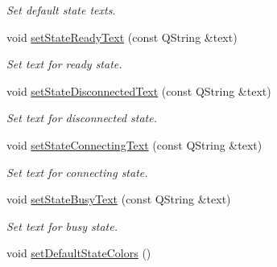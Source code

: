 \begin{DoxyCompactItemize}
\begin{DoxyCompactList}\small\item\em Set default state texts. \end{DoxyCompactList}\item 
\hypertarget{classmdt_port_status_widget_a3961e272b2a124e8c989084e5c263e18}{
void \hyperlink{classmdt_port_status_widget_a3961e272b2a124e8c989084e5c263e18}{setStateReadyText} (const QString \&text)}
\label{classmdt_port_status_widget_a3961e272b2a124e8c989084e5c263e18}

\begin{DoxyCompactList}\small\item\em Set text for ready state. \end{DoxyCompactList}\item 
\hypertarget{classmdt_port_status_widget_a3bf9ad36ee604e993a4802701c0b4f5a}{
void \hyperlink{classmdt_port_status_widget_a3bf9ad36ee604e993a4802701c0b4f5a}{setStateDisconnectedText} (const QString \&text)}
\label{classmdt_port_status_widget_a3bf9ad36ee604e993a4802701c0b4f5a}

\begin{DoxyCompactList}\small\item\em Set text for disconnected state. \end{DoxyCompactList}\item 
\hypertarget{classmdt_port_status_widget_a20930a75418e6c6ce6beae619521d7ec}{
void \hyperlink{classmdt_port_status_widget_a20930a75418e6c6ce6beae619521d7ec}{setStateConnectingText} (const QString \&text)}
\label{classmdt_port_status_widget_a20930a75418e6c6ce6beae619521d7ec}

\begin{DoxyCompactList}\small\item\em Set text for connecting state. \end{DoxyCompactList}\item 
\hypertarget{classmdt_port_status_widget_a5e74bad896b205add3183e1442f0d7d3}{
void \hyperlink{classmdt_port_status_widget_a5e74bad896b205add3183e1442f0d7d3}{setStateBusyText} (const QString \&text)}
\label{classmdt_port_status_widget_a5e74bad896b205add3183e1442f0d7d3}

\begin{DoxyCompactList}\small\item\em Set text for busy state. \end{DoxyCompactList}\item 
\hypertarget{classmdt_port_status_widget_afbf619cd274d866a2c0c06444a13dc75}{
void \hyperlink{classmdt_port_status_widget_afbf619cd274d866a2c0c06444a13dc75}{setDefaultStateColors} ()}
\label{classmdt_port_status_widget_afbf619cd274d866a2c0c06444a13dc75}


\end{DoxyCompactItemize}
